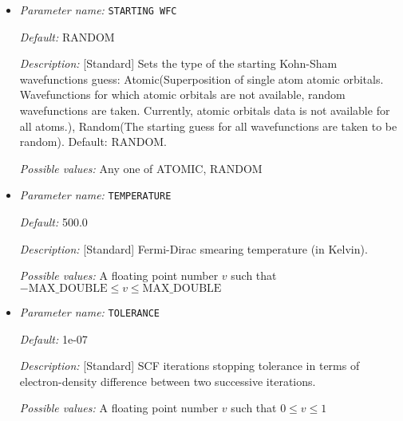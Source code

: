 \begin{itemize}
{\it Default:} 50


{\it Description:} [Standard] Maximum number of iterations to be allowed for SCF convergence


{\it Possible values:} An integer $n$ such that $1\leq n \leq 1000$
\item {\it Parameter name:} {\tt STARTING WFC}
\label{parameters:SCF parameters/STARTING WFC}
\label{parameters:SCF_20parameters/STARTING_20WFC}




{\it Default:} RANDOM


{\it Description:} [Standard] Sets the type of the starting Kohn-Sham wavefunctions guess: Atomic(Superposition of single atom atomic orbitals. Wavefunctions for which atomic orbitals are not available, random wavefunctions are taken. Currently, atomic orbitals data is not available for all atoms.), Random(The starting guess for all wavefunctions are taken to be random). Default: RANDOM.


{\it Possible values:} Any one of ATOMIC, RANDOM
\item {\it Parameter name:} {\tt TEMPERATURE}
\label{parameters:SCF parameters/TEMPERATURE}
\label{parameters:SCF_20parameters/TEMPERATURE}




{\it Default:} 500.0


{\it Description:} [Standard] Fermi-Dirac smearing temperature (in Kelvin).


{\it Possible values:} A floating point number $v$ such that $-\text{MAX\_DOUBLE} \leq v \leq \text{MAX\_DOUBLE}$
\item {\it Parameter name:} {\tt TOLERANCE}
\label{parameters:SCF parameters/TOLERANCE}
\label{parameters:SCF_20parameters/TOLERANCE}




{\it Default:} 1e-07


{\it Description:} [Standard] SCF iterations stopping tolerance in terms of electron-density difference between two successive iterations.


{\it Possible values:} A floating point number $v$ such that $0 \leq v \leq 1$
\end{itemize}



